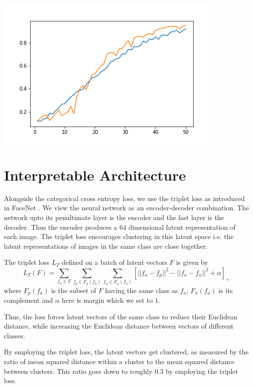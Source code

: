 \documentclass{article}
\begin{document}
\begin{sloppypar}
\begin{itemize}
\begin{center}
\begin{minipage}[b]{0.45\linewidth}
                    \includegraphics[width = \linewidth]{analysis/optimizer/sgd/sgd.png}
                \end{minipage}
            \end{center}
    \end{itemize}

    \section{Interpretable Architecture}
    Alongside the categorical cross entropy loss, we use the triplet loss as introduced in FaceNet \cite{facenet}. We view the neural network as an encoder-decoder combination.
    The network upto its penultimate layer is the encoder and the last layer is the decoder. Thus the encoder produces a $64$ dimensional latent representation of each image. 
    The triplet loss encourages clustering in this latent space i.e. the latent representations of images in the same class are close together.
    \par The triplet loss $L_T$ defined on a batch of latent vectors $F$ is given by 
    \begin{equation*}
        L_T(F) = \sum_{f_a \in F} \sum_{f_p \in F_p(f_a)} \sum_{f_n \in F_n(f_a)} [ ||f_a - f_p||^2 - ||f_a - f_n||^2 + \alpha ]_+
    \end{equation*}
    where $F_p(f_a)$ is the subset of $F$ having the same class as $f_a$, $F_n(f_a)$ is its complement and $\alpha$ here is margin which we set to $1$.
    \par Thus, the loss forces latent vectors of the same class to reduce their Euclidean distance, while increasing the Euclidean distance between vectors of different classes.
    \par By employing the triplet loss, the latent vectors get clustered, as measured by the ratio of mean squared distance within a cluster to the mean squared distance between clusters.
    This ratio goes down to roughly $0.3$ by employing the triplet loss.


\end{sloppypar}
\end{document}
